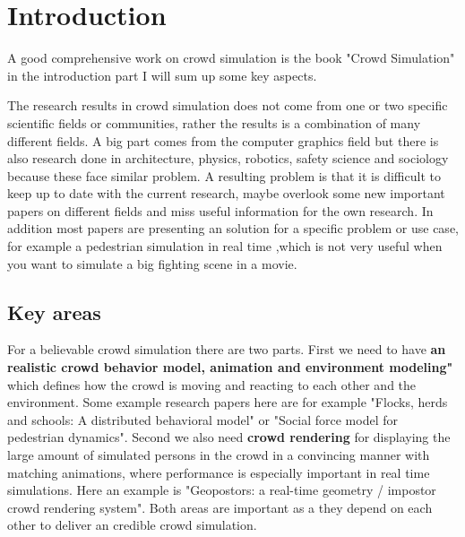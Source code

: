 \documentclass[sigconf]{acmart}
\begin{document}
\maketitle

\section{Introduction}

A good comprehensive work on crowd simulation is the book "Crowd Simulation" \cite{thalmann_crowd_2013} in the introduction part I will sum up some key aspects. 

The research results in crowd simulation does not come from one or two specific scientific fields or communities, rather the results is a combination of many different fields. A big part comes from the computer graphics field but there is also research done in architecture, physics, robotics, safety science and sociology because these face similar problem. A resulting problem is that it is difficult to keep up to date with the current research, maybe overlook some new important papers on different fields and miss useful information for the own research. In addition most papers are presenting an solution for a specific problem or use case, for example a pedestrian simulation in real time \cite{karamouzas_predictive_2009},which is not very useful when you want to simulate a big fighting scene in a movie.

\subsection{Key areas}
\label{chap:key_areas}
For a believable crowd simulation there are two parts. First we need to have \textbf{an realistic crowd behavior model, animation and environment modeling"} which defines how the crowd is moving and reacting to each other and the environment. Some example research papers here are for example "Flocks, herds and schools: A distributed behavioral model"\cite{reynolds_flocks_1987} or "Social force model for pedestrian dynamics"\cite{helbing_social_1995}. Second we also need \textbf{crowd rendering} for displaying the large amount of simulated persons in the crowd in a convincing manner with matching animations, where performance is especially important in real time simulations. Here an example is "Geopostors: a real-time geometry / impostor crowd rendering system"\cite{lee_crowd_2018}. Both areas are important as a they depend on each other to deliver an credible crowd simulation.
\end{document}
